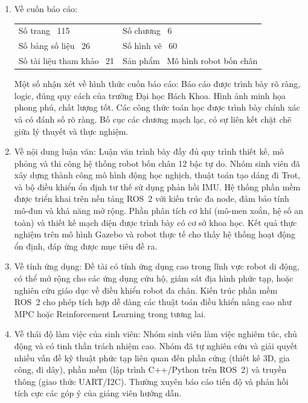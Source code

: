 \documentclass[12pt,a4paper]{article}
\begin{document}
\begin{enumerate}[label=\arabic*., leftmargin=0.6cm]
    \item \small Về cuốn báo cáo: \\
    \vspace{-0.2cm}
    \begin{tabular}{p{} p{}}
        Số trang \dotfill~115 & Số chương \dotfill~6 \\
        Số bảng số liệu \dotfill~26 & Số hình vẽ \dotfill~60 \\
        Số tài liệu tham khảo \dotfill~21 & Sản phẩm \dotfill~Mô hình robot bốn chân
    \end{tabular}
    
    \vspace{0.2cm}
    Một số nhận xét về hình thức cuốn báo cáo: Báo cáo được trình bày rõ ràng, logic, đúng quy cách của trường Đại học Bách Khoa. Hình ảnh minh họa phong phú, chất lượng tốt. Các công thức toán học được trình bày chính xác và có đánh số rõ ràng. Bố cục các chương mạch lạc, có sự liên kết chặt chẽ giữa lý thuyết và thực nghiệm.
    
    \vspace{0.2cm}
    \item Về nội dung luận văn: Luận văn trình bày đầy đủ quy trình thiết kế, mô phỏng và thi công hệ thống robot bốn chân 12 bậc tự do. Nhóm sinh viên đã xây dựng thành công mô hình động học nghịch, thuật toán tạo dáng đi Trot, và bộ điều khiển ổn định tư thế sử dụng phản hồi IMU. Hệ thống phần mềm được triển khai trên nền tảng ROS~2 với kiến trúc đa node, đảm bảo tính mô-đun và khả năng mở rộng. Phần phân tích cơ khí (mô-men xoắn, hệ số an toàn) và thiết kế mạch điện được trình bày có cơ sở khoa học. Kết quả thực nghiệm trên mô hình Gazebo và robot thực tế cho thấy hệ thống hoạt động ổn định, đáp ứng được mục tiêu đề ra.
    
    \vspace{0.2cm}
    \item Về tính ứng dụng: Đề tài có tính ứng dụng cao trong lĩnh vực robot di động, có thể mở rộng cho các ứng dụng cứu hộ, giám sát địa hình phức tạp, hoặc nghiên cứu giáo dục về điều khiển robot đa chân. Kiến trúc phần mềm ROS~2 cho phép tích hợp dễ dàng các thuật toán điều khiển nâng cao như MPC hoặc Reinforcement Learning trong tương lai.
    
    \vspace{0.2cm}
    \item Về thái độ làm việc của sinh viên: Nhóm sinh viên làm việc nghiêm túc, chủ động và có tinh thần trách nhiệm cao. Nhóm đã tự nghiên cứu và giải quyết nhiều vấn đề kỹ thuật phức tạp liên quan đến phần cứng (thiết kế 3D, gia công, đi dây), phần mềm (lập trình C++/Python trên ROS~2) và truyền thông (giao thức UART/I2C). Thường xuyên báo cáo tiến độ và phản hồi tích cực các góp ý của giảng viên hướng dẫn.
\end{enumerate}
\end{document}
